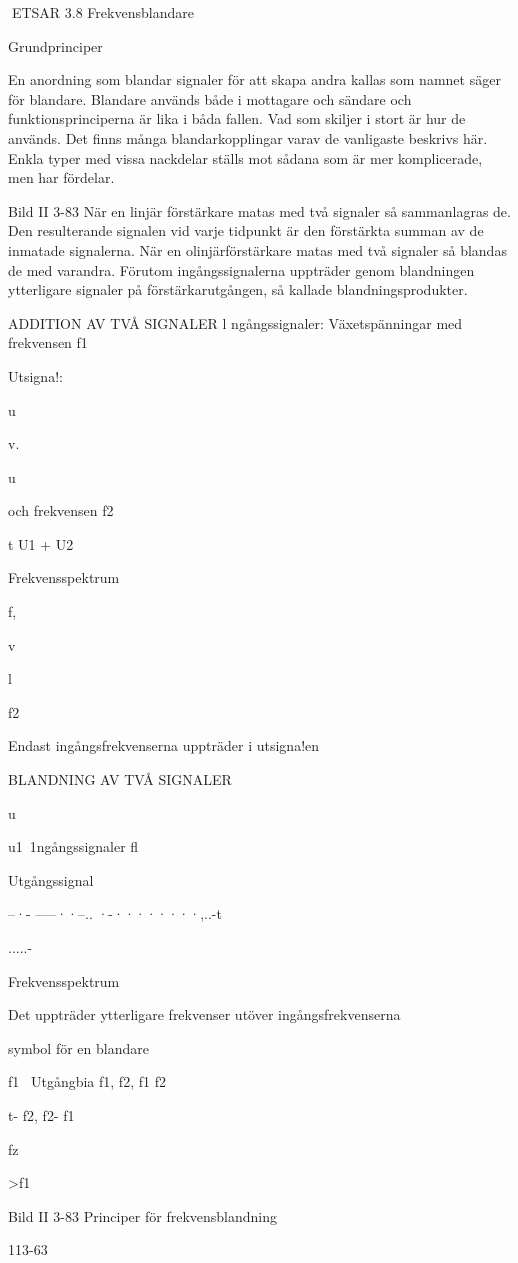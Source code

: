 \documentclass[a4paper,twoside,twocolumn,openright]{book}
\begin{document}
{{{{{{{ETSAR
3.8 Frekvensblandare

Grundprinciper

En anordning som blandar signaler för att
skapa andra kallas som namnet säger för
blandare. Blandare används både i mottagare och sändare och funktionsprinciperna
är lika i båda fallen. Vad som skiljer i stort är
hur de används.
Det finns många blandarkopplingar varav de vanligaste beskrivs här. Enkla typer
med vissa nackdelar ställs mot sådana som
är mer komplicerade, men har fördelar.

Bild II 3-83
När en linjär förstärkare matas med två
signaler så sammanlagras de. Den resulterande signalen vid varje tidpunkt är den
förstärkta summan av de inmatade signalerna.
När en olinjärförstärkare matas med två
signaler så blandas de med varandra. Förutom ingångssignalerna uppträder genom
blandningen ytterligare signaler på förstärkarutgången, så kallade blandningsprodukter.

ADDITION AV TVÅ SIGNALER
l ngångssignaler:
Växetspänningar med frekvensen f1

Utsigna!:

u

v.

u

och frekvensen f2

t U1 + U2

Frekvensspektrum

f,

v

l

f2

Endast ingångsfrekvenserna
uppträder i utsigna!en

BLANDNING AV TVÅ SIGNALER

u

u1~1ngångssignaler
fl

Utgångssignal

--·- -----··--.. ·-········,..-t

.....-

Frekvensspektrum

Det uppträder ytterligare frekvenser
utöver ingångsfrekvenserna

symbol för en blandare

f1~ Utgångbia f1, f2, f1
f2

t- f2, f2- f1

fz

>f1

Bild II 3-83 Principer för frekvensblandning

113-63

}}}}}}}
\end{document}
